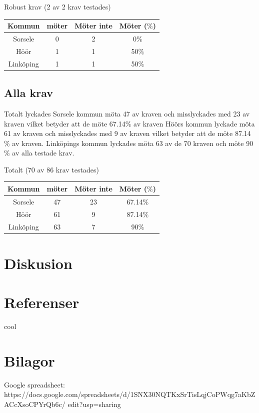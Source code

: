 \documentclass[11p]{article}
\begin{document}
    \begin{center}
    Robust krav (2 av 2 krav testades)

    \begin{tabular}{ |c|c|c|c|}
        \hline
        Kommun & möter & Möter inte & Möter ($\%$) \\  \hline
        Sorsele & 0 & 2 & 0$\%$ \\ \hline
        Höör & 1 & 1 & 50$\%$ \\ \hline
        Linköping & 1 & 1 & 50$\%$ \\ \hline
    \end{tabular}
    \end{center}
    
    \subsection{Alla krav}
    Totalt lyckades Sorsele kommun möta 47 av kraven och misslyckades med 23 av kraven vilket betyder att de möte 67.14$\%$ av kraven
    Höörs kommun lyckade möta 61 av kraven och misslyckades med 9 av kraven vilket betyder att de möte 87.14$\%$ av kraven.
    Linköpings kommun lyckades möta 63 av de 70 kraven och möte 90$\%$ av alla testade krav.

    \begin{center}
    Totalt (70 av 86 krav testades)

    \begin{tabular}{ |c|c|c|c|}
        \hline
        Kommun & möter & Möter inte & Möter ($\%$) \\  \hline
        Sorsele & 47 & 23 & 67.14$\%$ \\ \hline
        Höör & 61 & 9 & 87.14$\%$ \\ \hline
        Linköping & 63 & 7 & 90$\%$ \\ \hline
    \end{tabular}
    \end{center}

    \section{Diskusion}

    \section{Referenser}

    \printbibliography

    cool

    \section{Bilagor}
    Google spreadsheet:
    \\ https://docs.google.com/spreadsheets/d/1SNX30NQTKxSrTisLqjCoPWqg7aKbZACcXsoCPYrQb6c/
    edit?usp=sharing
\end{document}
